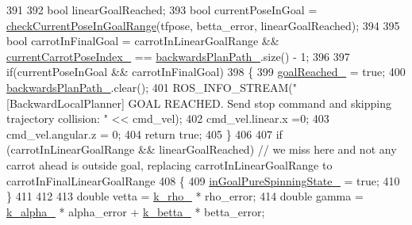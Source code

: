 \begin{DoxyCode}
391 
392             \textcolor{keywordtype}{bool} linearGoalReached;
393             \textcolor{keywordtype}{bool} currentPoseInGoal = \hyperlink{classcl__move__base__z_1_1backward__local__planner_1_1BackwardLocalPlanner_a8b84e3961a79317a9c978ec054e4a112}{checkCurrentPoseInGoalRange}(tfpose,
      betta\_error, linearGoalReached);
394 
395             \textcolor{keywordtype}{bool} carrotInFinalGoal = carrotInLinearGoalRange && 
      \hyperlink{classcl__move__base__z_1_1backward__local__planner_1_1BackwardLocalPlanner_a2e8f2b78bc97f27c5fa431f3af2261ed}{currentCarrotPoseIndex\_} == \hyperlink{classcl__move__base__z_1_1backward__local__planner_1_1BackwardLocalPlanner_ad9cde5c85f782cab2ddb4030e3c3f2cf}{backwardsPlanPath\_}.size() - 1;
396 
397             \textcolor{keywordflow}{if}(currentPoseInGoal && carrotInFinalGoal)
398             \{
399                 \hyperlink{classcl__move__base__z_1_1backward__local__planner_1_1BackwardLocalPlanner_ad443c52ef585a8eab0364f0909222f51}{goalReached\_} = \textcolor{keyword}{true};
400                 \hyperlink{classcl__move__base__z_1_1backward__local__planner_1_1BackwardLocalPlanner_ad9cde5c85f782cab2ddb4030e3c3f2cf}{backwardsPlanPath\_}.clear();
401                 ROS\_INFO\_STREAM(\textcolor{stringliteral}{" [BackwardLocalPlanner] GOAL REACHED. Send stop command and skipping
       trajectory collision: "} << cmd\_vel);
402                 cmd\_vel.linear.x =0;
403                 cmd\_vel.angular.z = 0;
404                 \textcolor{keywordflow}{return} \textcolor{keyword}{true};
405             \}
406 
407             \textcolor{keywordflow}{if} (carrotInLinearGoalRange && linearGoalReached) \textcolor{comment}{// we miss here and not any carrot ahead is
       outside goal, replacing carrotInLinearGoalRange to carrotInFinalLinearGoalRange}
408             \{
409                 \hyperlink{classcl__move__base__z_1_1backward__local__planner_1_1BackwardLocalPlanner_ae4d7254afd19ae1f7bd8eac9f5d58b9a}{inGoalPureSpinningState\_} = \textcolor{keyword}{true};
410             \}
411 
412 
413                 \textcolor{keywordtype}{double} vetta = \hyperlink{classcl__move__base__z_1_1backward__local__planner_1_1BackwardLocalPlanner_ad8a36184bfb011545c751109e23d3b98}{k\_rho\_} * rho\_error;
414                 \textcolor{keywordtype}{double} gamma = \hyperlink{classcl__move__base__z_1_1backward__local__planner_1_1BackwardLocalPlanner_abf7a5a56de2ee41afba7e63c0628ec35}{k\_alpha\_} * alpha\_error + \hyperlink{classcl__move__base__z_1_1backward__local__planner_1_1BackwardLocalPlanner_a9f257183d87f1d732cb7e404f09905ad}{k\_betta\_} * betta\_error;

\end{DoxyCode}
